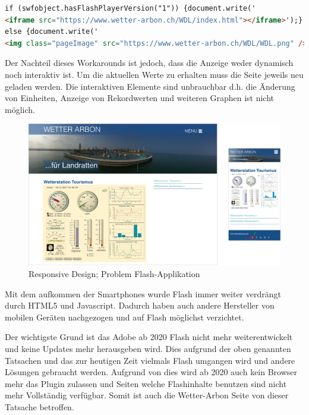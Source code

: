 \begin{lstlisting}[caption={Adobe Flash workaround für iOS},label={lst:flash},language=html]
if (swfobject.hasFlashPlayerVersion("1")) {document.write('
<iframe src="https://www.wetter-arbon.ch/WDL/index.html"></iframe>');} 
else {document.write('
<img class="pageImage" src="https://www.wetter-arbon.ch/WDL/WDL.png" />');}
\end{lstlisting}

Der Nachteil dieses Workarounds ist jedoch, dass die Anzeige weder dynamisch noch interaktiv ist. Um die aktuellen Werte zu erhalten muss die Seite jeweils neu geladen werden. Die interaktiven Elemente sind unbrauchbar d.h. die Änderung von Einheiten, Anzeige von Rekordwerten und weiteren Graphen ist nicht möglich.

\begin{figure}[h!]
	\centering
	\includegraphics[width=1\linewidth]{img/responsive}
	\caption{Responsive Design; Problem Flash-Applikation}
	\label{img:responsive}
\end{figure}


Mit dem aufkommen der Smartphones wurde Flash immer weiter verdrängt durch HTML5 und Javascript. Dadurch haben auch andere Hersteller von mobilen Geräten nachgezogen und auf Flash möglichst verzichtet. 

Der wichtigste Grund ist das Adobe ab 2020 Flash nicht mehr weiterentwickelt und keine Updates mehr herausgeben wird. Dies aufgrund der oben genannten Tatsachen und das zur heutigen Zeit vielmals Flash umgangen wird und andere Lösungen gebraucht werden. Aufgrund von dies wird ab 2020 auch kein Browser mehr das Plugin zulassen und Seiten welche Flashinhalte benutzen sind nicht mehr Vollständig verfügbar. Somit ist auch die Wetter-Arbon Seite von dieser Tatsache betroffen. \cite{Adobe:FlashTheFutureofInteractiveContent}\\


